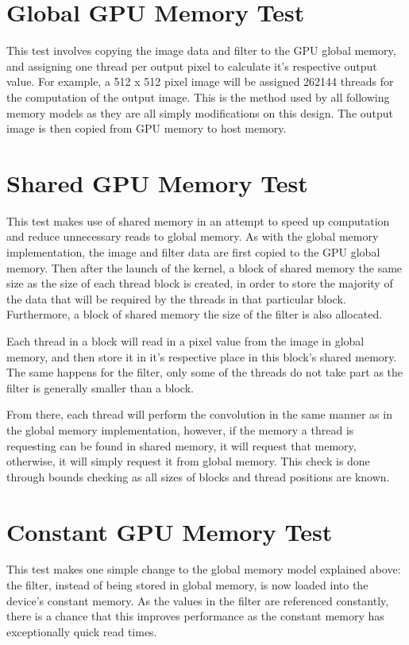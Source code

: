 \documentclass[a4paper,twoside,11pt]{report}
\begin{document}
\section{Global GPU Memory Test}
This test involves copying the image data and filter to the GPU global memory, and assigning one thread per output pixel to calculate it's respective output value. For example, a 512 x 512 pixel image will be assigned 262144 threads for the computation of the output image. This is the method used by all following memory models as they are all simply modifications on this design. The output image is then copied from GPU memory to host memory.

\section{Shared GPU Memory Test}
This test makes use of shared memory in an attempt to speed up computation and reduce unnecessary reads to global memory. As with the global memory implementation, the image and filter data are first copied to the GPU global memory. Then after the launch of the kernel, a block of shared memory the same size as the size of each thread block is created, in order to store the majority of the data that will be required by the threads in that particular block. Furthermore, a block of shared memory the size of the filter is also allocated.

Each thread in a block will read in a pixel value from the image in global memory, and then store it in it's respective place in this block's shared memory. The same happens for the filter, only some of the threads do not take part as the filter is generally smaller than a block.

From there, each thread will perform the convolution in the same manner as in the global memory implementation, however, if the memory a thread is requesting can be found in shared memory, it will request that memory, otherwise, it will simply request it from global memory. This check is done through bounds checking as all sizes of blocks and thread positions are known.

\section{Constant GPU Memory Test}
This test makes one simple change to the global memory model explained above: the filter, instead of being stored in global memory, is now loaded into the device's constant memory. As the values in the filter are referenced constantly, there is a chance that this improves performance as the constant memory has exceptionally quick read times.
\end{document}

